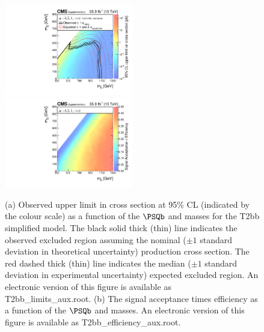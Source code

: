 \begin{figure}
    \begin{center}
            \includegraphics[width=0.50\textwidth]{Supplementary/CMS-SUS-16-038_Figure-aux_018-a}
            \includegraphics[width=0.50\textwidth]{Supplementary/CMS-SUS-16-038_Figure-aux_018-b}
        \caption{ (a) Observed upper limit in cross section at 95\% CL (indicated
        by the colour scale) as a function of 
        the $\PSQb$ and \PSGczDo %
        masses for the 
        T2bb %
        simplified  model.  The  black  solid thick  (thin)  line indicates  the
        observed  excluded  region  assuming   the  nominal  (${\pm}1$  standard
        deviation in theoretical uncertainty)  production cross section. The red
        dashed  thick  (thin)  line  indicates  the  median  (${\pm}1$  standard
        deviation in experimental uncertainty) expected excluded region.
    An electronic version of this figure is available as T2bb\_limits\_aux.root.
        (b) The signal acceptance times efficiency as a function of 
        the $\PSQb$ and \PSGczDo %
        masses.
    An electronic version of this figure is available as T2bb\_efficiency\_aux.root.
        }
        \label{fig:T2bb}
    \end{center}
\end{figure}

